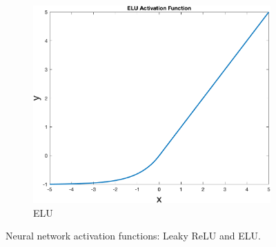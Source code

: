 \begin{figure}[!ht]
\begin{subfigure}[b]{0.3\textwidth}
            \includegraphics[width=\textwidth]{figures/elu}
            \caption{ELU}
            \label{fig:elu}
        \end{subfigure}
        \caption{Neural network activation functions: Leaky ReLU and ELU.}
        \label{fig:activationfunctions}
    \end{figure}